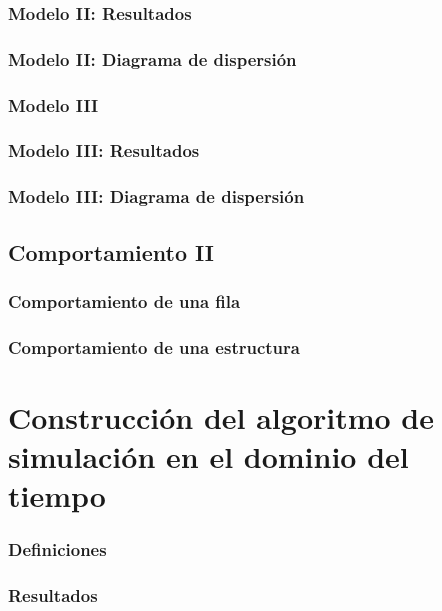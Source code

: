\documentclass{beamer}
\begin{document}
		\begin{frame} %
		\frametitle{Modelo II: Resultados}
		\end{frame}
		
		\begin{frame} %
		\frametitle{Modelo II: Diagrama de dispersión}
		\end{frame}
	
		\begin{frame} %
		\frametitle{Modelo III}
		\end{frame}
	
		\begin{frame} %
		\frametitle{Modelo III: Resultados}
		\end{frame}
	
		\begin{frame} %
		\frametitle{Modelo III: Diagrama de dispersión}
		\end{frame}
	
	\subsection{Comportamiento II}
		\begin{frame} %
		\frametitle{Comportamiento de una fila}
		\end{frame}
	
		\begin{frame} %
		\frametitle{Comportamiento de una estructura}
		\end{frame}
	
\section{Construcción del algoritmo de simulación en el dominio del tiempo}
		\begin{frame} %
		\frametitle{Definiciones}
		\end{frame}
	
		\begin{frame} %
		\frametitle{Resultados}
		\end{frame}
\end{document}
